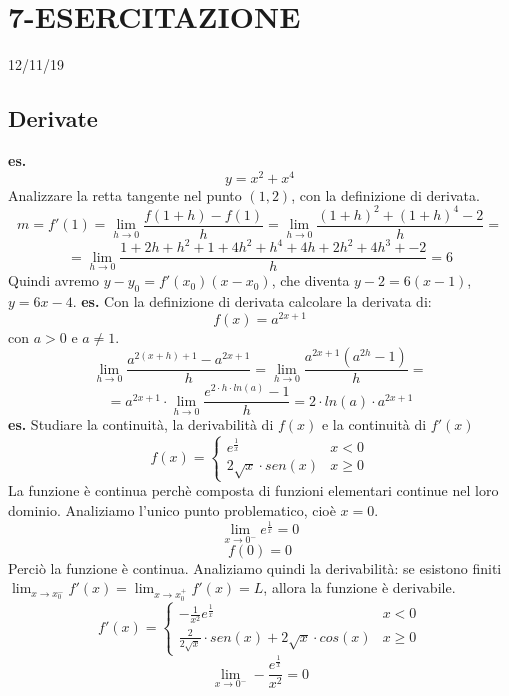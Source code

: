 \section*{7-ESERCITAZIONE}
12/11/19
\subsection*{Derivate}
\textbf{es.} 
\[
    y = x^2 +x^4
\]
Analizzare la retta tangente nel punto $(1,2)$, con la definizione di derivata.
\[
    m = f'(1) = \lim_{h\rightarrow 0} \frac{f(1+h)-f(1)}{h} = \lim_{h\rightarrow 0} \frac{(1+h)^2 + (1+h)^4 -2}{h} =
\]
\[
    = \lim_{h\rightarrow 0} \frac{1 + 2h+ h^2 + 1 + 4h^2 +h^4 +4h +2h^2 + 4h^3 +-2}{h} = 6
\]
Quindi avremo $y-y_0 = f'(x_0)(x-x_0)$, che diventa $y-2 = 6(x-1)$, $y = 6x-4$.\newline
\newline
\newline
\textbf{es.} Con la definizione di derivata calcolare la derivata di:
\[
    f(x) = a^{2x+1}
\]
con $a > 0$ e $a\neq 1$.
\[
    \lim_{h\rightarrow 0} \frac{a^{2(x+h)+1}-a^{2x+1}}{h} = \lim_{h\rightarrow 0} \frac{a^{2x+1}(a^{2h}-1)}{h}= 
\]
\[
    = a^{2x+1} \cdot  \lim_{h\rightarrow 0} \frac{e^{2 \cdot h \cdot ln(a) }-1}{h} = 2 \cdot ln(a) \cdot  a^{2x+1}
\]
\newline
\newline
\newline
\textbf{es.} Studiare la continuità, la derivabilità di $f(x)$ e la continuità di $f'(x)$
\[
    f(x)= \begin{cases}
        e^{\frac{1}{x}} & x<0 \\
        2 \sqrt{x} \cdot  sen(x) & x\geq 0
    \end{cases}
\]
La funzione è continua perchè composta di funzioni elementari continue nel loro dominio. Analiziamo l'unico punto problematico, cioè $x=0$.
\[
    \lim_{x\rightarrow 0^-} e ^{\frac{1}{x}} = 0 
\]
\[
    f(0) = 0
\]
Perciò la funzione è continua.\newline
Analiziamo quindi la derivabilità: se esistono finiti $\lim_{x\rightarrow x_0^-} f'(x) = \lim_{x\rightarrow x_0^+} f'(x) = L$, allora la funzione è derivabile.
\[
    f'(x) = \begin{cases}
        - \frac{1}{x^2} e ^{\frac{1}{x}} & x<0\\
        \frac{2}{2 \sqrt{x}} \cdot  sen(x) + 2 \sqrt{x} \cdot cos(x)& x \geq 0
    \end{cases}
\]
\[
    \lim_{x\rightarrow 0^-} - \frac{ e ^{\frac{1}{x}}}{x^2} = 0
\]
